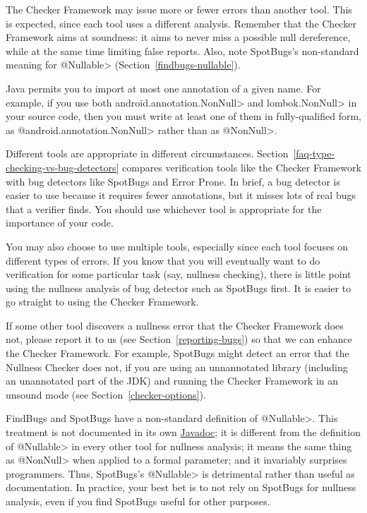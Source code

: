 The Checker Framework may issue more or fewer errors than another tool.
This is expected, since each tool uses a different analysis.  Remember that
the Checker Framework aims at soundness:  it aims to never miss a possible
null dereference, while at the same time limiting false reports.  Also,
note SpotBugs's non-standard meaning for \<@Nullable>
(Section~\ref{findbugs-nullable}).

Java permits you to import at most one annotation of a given name.  For
example, if you use both \<android.annotation.NonNull> and
\<lombok.NonNull> in your source code, then you must write at least one of
them in fully-qualified form, as \<@android.annotation.NonNull> rather than
as \<@NonNull>.



Different tools are appropriate in different circumstances.
Section~\ref{faq-type-checking-vs-bug-detectors} compares verification
tools like the Checker Framework with bug detectors like SpotBugs and Error
Prone.  In brief, a bug detector is easier to use because it requires fewer
annotations, but it misses lots of real bugs that a verifier finds.  You
should use whichever tool is appropriate for the importance of your code.

You may also choose to use multiple tools, especially since each tool
focuses on different types of errors.  If you know that you will eventually
want to do verification for some particular task (say, nullness checking),
there is little point using the nullness analysis of bug detector such as
SpotBugs first.  It is easier to go straight to using the
Checker Framework.

If some other tool discovers a nullness error that the Checker
Framework does not, please report it to us (see
Section~\ref{reporting-bugs}) so that we can enhance the Checker Framework.
For example, SpotBugs might detect an error that the Nullness Checker does
not, if you are using an unnannotated library (including an unannotated
part of the JDK) and running the Checker Framework in an unsound mode (see
Section~\ref{checker-options}).



FindBugs and SpotBugs have a non-standard definition of
\<@Nullable>.  This treatment is not documented in its own
\href{https://www.javadoc.io/doc/com.github.spotbugs/spotbugs-annotations/latest/edu/umd/cs/findbugs/annotations/Nullable.html}{Javadoc};
it is different from the definition of \<@Nullable> in every other tool for
nullness analysis; it means the same thing as \<@NonNull> when applied to a
formal parameter; and it invariably surprises programmers.  Thus, SpotBugs's
\<@Nullable> is detrimental rather than useful as documentation.
In practice, your best bet is to not rely on SpotBugs for nullness analysis,
even if you find SpotBugs useful for other purposes.

